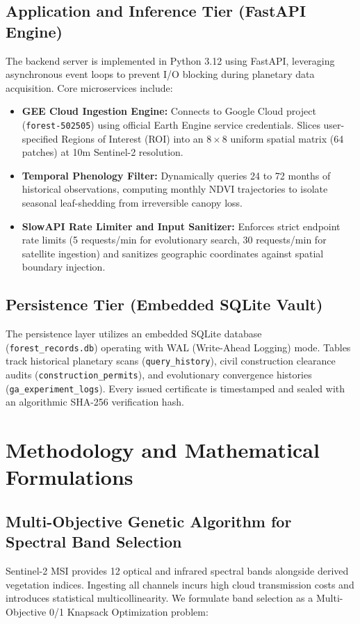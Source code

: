 \documentclass[conference]{IEEEtran}
\begin{document}
\subsection{Application and Inference Tier (FastAPI Engine)}
The backend server is implemented in Python 3.12 using FastAPI, leveraging asynchronous event loops to prevent I/O blocking during planetary data acquisition. Core microservices include:
\begin{itemize}
    \item \textbf{GEE Cloud Ingestion Engine:} Connects to Google Cloud project (\texttt{forest-502505}) using official Earth Engine service credentials. Slices user-specified Regions of Interest (ROI) into an $8 \times 8$ uniform spatial matrix (64 patches) at 10m Sentinel-2 resolution.
    \item \textbf{Temporal Phenology Filter:} Dynamically queries 24 to 72 months of historical observations, computing monthly NDVI trajectories to isolate seasonal leaf-shedding from irreversible canopy loss.
    \item \textbf{SlowAPI Rate Limiter and Input Sanitizer:} Enforces strict endpoint rate limits (5 requests/min for evolutionary search, 30 requests/min for satellite ingestion) and sanitizes geographic coordinates against spatial boundary injection.
\end{itemize}

\subsection{Persistence Tier (Embedded SQLite Vault)}
The persistence layer utilizes an embedded SQLite database (\texttt{forest\_records.db}) operating with WAL (Write-Ahead Logging) mode. Tables track historical planetary scans (\texttt{query\_history}), civil construction clearance audits (\texttt{construction\_permits}), and evolutionary convergence histories (\texttt{ga\_experiment\_logs}). Every issued certificate is timestamped and sealed with an algorithmic SHA-256 verification hash.

\section{Methodology and Mathematical Formulations}

\subsection{Multi-Objective Genetic Algorithm for Spectral Band Selection}
Sentinel-2 MSI provides 12 optical and infrared spectral bands alongside derived vegetation indices. Ingesting all channels incurs high cloud transmission costs and introduces statistical multicollinearity. We formulate band selection as a Multi-Objective 0/1 Knapsack Optimization problem:
\end{document}

